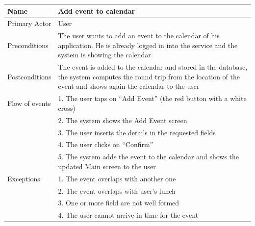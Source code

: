 \begin{center}
\def\arraystretch{1.25}
  \begin{tabular}{ | l | p{} | }
    \hline
    Name & Add event to calendar \\ \hline
    Primary Actor & User \\ \hline
    Preconditions & The user wants to add an event to the calendar of his application. He is already logged in into the service and the system is showing the calendar \\ \hline
    Postconditions & The event is added to the calendar and stored in the database, the system computes the round trip from the location of the event and shows again the calendar to the user \\ \hline
    Flow of events  & 1.	The user taps on “Add Event” (the red button with a white cross) \\
					& 2.	The system shows the Add Event screen \\
					& 3.	The user inserts the details in the requested fields \\
					& 4.	The user clicks on “Confirm” \\
					& 5.	The system adds the event to the calendar and shows the updated Main screen to the user \\
 \hline    
    Exceptions  & 1.	The event overlaps with another one \\
				& 2.	The event overlaps with user’s lunch \\
				& 3.	One or more field are not well formed \\
				& 4.	The user cannot arrive in time for the event \\
 \hline
  \end{tabular}
\end{center}

